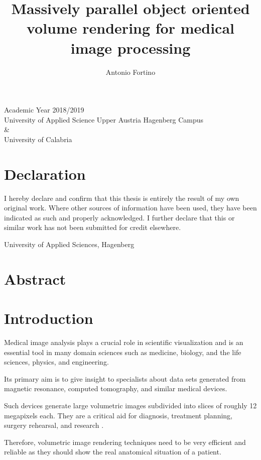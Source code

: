 \documentclass[12pt,a4paper]{extarticle}
\author{Antonio Fortino}
\title{Massively parallel object oriented volume rendering for medical image processing}
\begin{document}
\maketitle
\begin{center}
Academic Year 2018/2019\\
University of Applied Science Upper Austria Hagenberg Campus\\
\&\\
University of Calabria
\end{center}
\pagebreak
\fancyhf{}
\fancyhead[R]{\thepage}
\section*{Declaration}
\noindent
I hereby declare and confirm that this thesis is entirely the result of my own original work. 
Where other sources of information have been used, they have been indicated as such and properly 
acknowledged. I further declare that this or similar work has not been submitted for credit elsewhere.
\vspace{10mm}

\noindent
University of Applied Sciences, Hagenberg 
\vspace{12mm}

\noindent
\theauthor
\pagebreak
\section*{Abstract}
\pagebreak
\tableofcontents
\pagebreak

\section*{Introduction} 
Medical image analysis plays a crucial role in scientific visualization and is an essential tool in many domain sciences such as medicine, biology, and the life sciences, physics, and engineering.

Its primary aim is to give insight to specialists about data sets generated from magnetic resonance, computed tomography, and similar medical devices.

Such devices generate large volumetric images subdivided into slices of roughly 12 megapixels each. They are a critical aid for diagnosis, treatment planning, surgery rehearsal, and research \cite{VISINMED:1}.

Therefore, volumetric image rendering techniques need to be very efficient and reliable as they should show the real anatomical situation of a patient.
\end{document}
